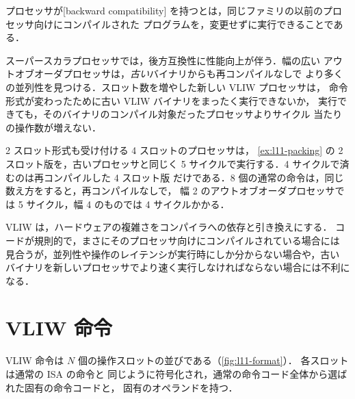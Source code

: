 \documentclass[../main.tex]{subfiles}
\begin{document}
\begin{definition}[後方互換性]
  プロセッサが[backward compatibility]%
  を持つとは，同じファミリの以前のプロセッサ向けにコンパイルされた
  プログラムを，変更せずに実行できることである．
\end{definition}

スーパースカラプロセッサでは，後方互換性に性能向上が伴う．幅の広い
アウトオブオーダプロセッサは，\emph{古い}バイナリからも再コンパイルなしで
より多くの並列性を見つける．スロット数を増やした新しい VLIW プロセッサは，
命令形式が変わったために古い VLIW バイナリをまったく実行できないか，
実行できても，そのバイナリのコンパイル対象だったプロセッサよりサイクル
当たりの操作数が増えない．%

\begin{example}
  \label{ex:l11-compat}
  2 スロット形式も受け付ける 4 スロットのプロセッサは，
  \cref{ex:l11-packing} の 2 スロット版を，古いプロセッサと同じく
  5 サイクルで実行する．4 サイクルで済むのは再コンパイルした 4 スロット版
  だけである．8 個の通常の命令は，同じ数え方をすると，再コンパイルなしで，
  幅 2 のアウトオブオーダプロセッサでは 5 サイクル，幅 4 のものでは
  4 サイクルかかる．
\end{example}

\begin{keypoint}
  VLIW は，ハードウェアの複雑さをコンパイラへの依存と引き換えにする．
  コードが規則的で，まさにそのプロセッサ向けにコンパイルされている場合には
  見合うが，並列性や操作のレイテンシが実行時にしか分からない場合や，古い
  バイナリを新しいプロセッサでより速く実行しなければならない場合には不利に
  なる．
\end{keypoint}

\section{VLIW 命令}
\label{sec:l11-instructions}

VLIW 命令は $N$ 個の操作スロットの並びである（\cref{fig:l11-format}）．
各スロットは通常の ISA の命令と
同じように符号化され，通常の命令コード全体から選ばれた固有の命令コードと，
固有のオペランドを持つ．
\end{document}
